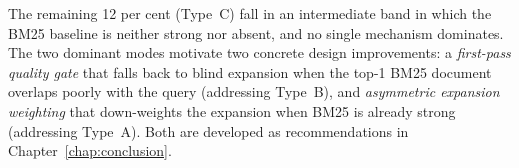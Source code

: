 The remaining 12 per cent (Type~C) fall in an intermediate band in which the BM25 baseline is neither strong nor absent, and no single mechanism dominates. The two dominant modes motivate two concrete design improvements: a \emph{first-pass quality gate} that falls back to blind expansion when the top-1 BM25 document overlaps poorly with the query (addressing Type~B), and \emph{asymmetric expansion weighting} that down-weights the expansion when BM25 is already strong (addressing Type~A). Both are developed as recommendations in Chapter~\ref{chap:conclusion}.

